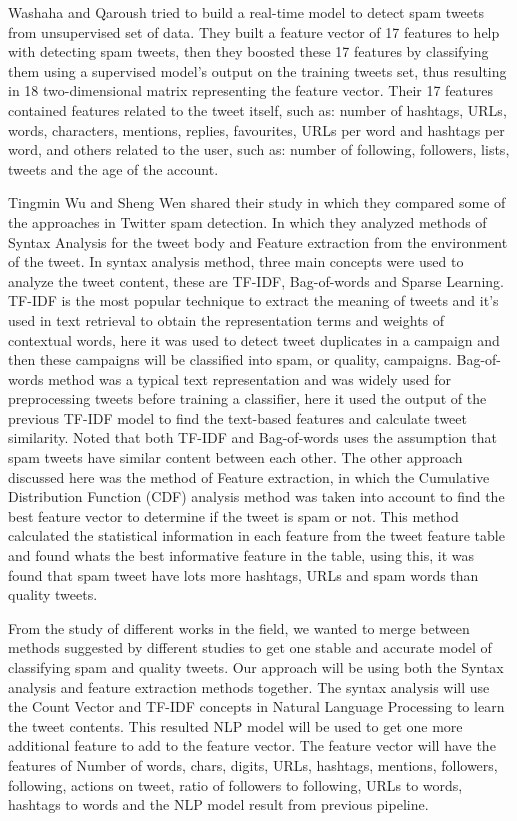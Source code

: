 \documentclass[conference]{IEEEtran}
\begin{document}
Washaha and Qaroush tried to build a real-time model to detect spam tweets from unsupervised set of data\cite{b3}. They built a feature vector of 17 features to help with detecting spam tweets, then they boosted these 17 features by classifying them using a supervised model's output on the training tweets set, thus resulting in 18 two-dimensional matrix representing the feature vector. Their 17 features contained features related to the tweet itself, such as: number of hashtags, URLs, words, characters, mentions, replies, favourites, URLs per word and hashtags per word, and others related to the user, such as: number of following, followers, lists, tweets and the age of the account. 

Tingmin Wu and Sheng  Wen shared their study in which they compared some of the approaches in Twitter spam detection\cite{b4}. In which they analyzed methods of Syntax Analysis for the tweet body and Feature extraction from the environment of the tweet. In syntax analysis method, three main concepts were used to analyze the tweet content, these are TF-IDF, Bag-of-words and Sparse Learning. TF-IDF is the most popular technique to extract the meaning of tweets and it's used in text retrieval to obtain the representation terms and weights of contextual words, here it was used to detect tweet duplicates in a campaign and then these campaigns will be classified into spam, or quality, campaigns. Bag-of-words method was a typical text representation and was widely used for preprocessing tweets before training a classifier, here it used the output of the previous TF-IDF model to find the text-based features and calculate tweet similarity. Noted that both TF-IDF and Bag-of-words uses the assumption that spam tweets have similar content between each other. The other approach discussed here was the method of Feature extraction, in which the Cumulative Distribution Function (CDF) analysis method was taken into account to find the best feature vector to determine if the tweet is spam or not. This method calculated the statistical information in each feature from the tweet feature table and found whats the best informative feature in the table, using this, it was found that spam tweet have lots more hashtags, URLs and spam words than quality tweets.

From the study of different works in the field, we wanted to merge between methods suggested by different studies to get one stable and accurate model of classifying spam and quality tweets. Our approach will be using both the Syntax analysis and feature extraction methods together. The syntax analysis will use the Count Vector and TF-IDF concepts in Natural Language Processing to learn the tweet contents. This resulted NLP model will be used to get one more additional feature to add to the feature vector. The feature vector will have the features of Number of words, chars, digits, URLs, hashtags, mentions, followers, following, actions on tweet, ratio of followers to following, URLs to words, hashtags to words and the NLP model result from previous pipeline.
\end{document}

